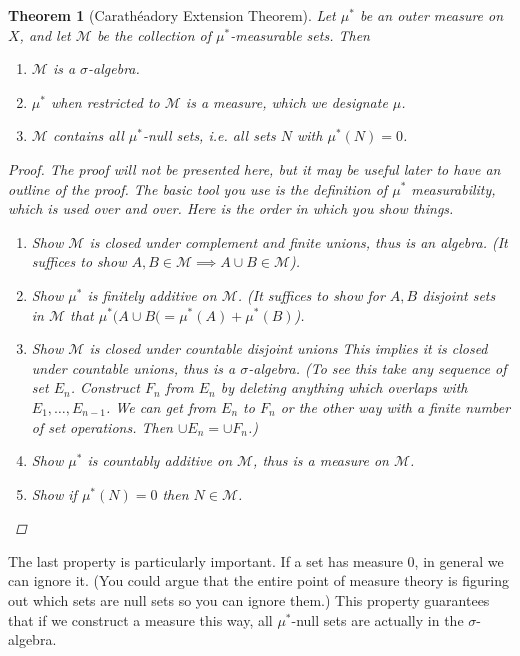 \documentclass[10pt]{article}         %
\newtheorem{theorem}{Theorem}[section]
\theoremstyle{remark}
\begin{document}
\begin{theorem}[Carath\'{e}adory Extension Theorem]
Let $\mu^*$ be an outer measure on $X$, and let $\mathcal{M}$ be the collection of $\mu^*$-measurable sets. Then
\begin{enumerate}
    \item $\mathcal{M}$ is a $\sigma$-algebra.
    \item $\mu^*$ when restricted to $\mathcal{M}$ is a measure, which we designate $\mu$.
    \item $\mathcal{M}$ contains all $\mu^*$-null sets, i.e. all sets $N$ with $\mu^*(N) = 0$.
\end{enumerate}
\begin{proof}
The proof will not be presented here, but it may be useful later to have an outline of the proof. The basic tool you use is the definition of $\mu^*$ measurability, which is used over and over. Here is the order in which you show things.
\begin{enumerate}
    \item Show $\mathcal{M}$ is closed under complement and finite unions, thus is an algebra. (It suffices to show $A, B \in \mathcal{M} \implies A \cup B \in \mathcal{M}$).
    \item Show $\mu^*$ is finitely additive on $\mathcal{M}$. (It suffices to show for $A, B$ disjoint sets in $\mathcal{M}$ that $\mu^*(A \cup B( = \mu^*(A) + \mu^*(B)$).
    \item Show $\mathcal{M}$ is closed under countable disjoint unions This implies it is closed under countable unions, thus is a $\sigma$-algebra. (To see this take any sequence of set $E_n$. Construct $F_n$ from $E_n$ by deleting anything which overlaps with $E_1, \dots, E_{n-1}$. We can get from $E_n$ to $F_n$ or the other way with a finite number of set operations. Then $\cup E_n = \cup F_n$.)
    \item Show $\mu^*$ is countably additive on $\mathcal{M}$, thus is a measure on $\mathcal{M}$.
    \item Show if $\mu^*(N) = 0$ then $N \in \mathcal{M}$.
\end{enumerate}
\end{proof}
\end{theorem}

The last property is particularly important. If a set has measure 0, in general we can ignore it. (You could argue that the entire point of measure theory is figuring out which sets are null sets so you can ignore them.) This property guarantees that if we construct a measure this way, all $\mu^*$-null sets are actually in the $\sigma$-algebra.
\end{document}
